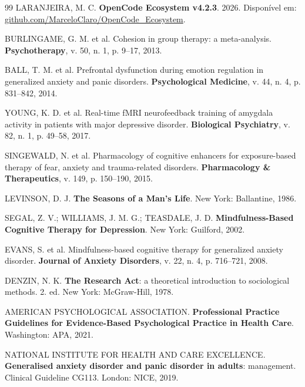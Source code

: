 \documentclass[12pt,a4paper]{article}
\begin{document}
\begin{thebibliography}{99}
LARANJEIRA, M. C. \textbf{OpenCode Ecosystem v4.2.3}. 2026.
Disponível em: \href{https://github.com/MarceloClaro/OpenCode_Ecosystem}{github.com/MarceloClaro/OpenCode\_Ecosystem}.

BURLINGAME, G. M. et al. Cohesion in group therapy: a meta-analysis. \textbf{Psychotherapy}, v. 50, n. 1, p. 9--17, 2013.

BALL, T. M. et al. Prefrontal dysfunction during emotion regulation in generalized anxiety and panic disorders. \textbf{Psychological Medicine}, v. 44, n. 4, p. 831--842, 2014.

YOUNG, K. D. et al. Real-time fMRI neurofeedback training of amygdala activity in patients with major depressive disorder. \textbf{Biological Psychiatry}, v. 82, n. 1, p. 49--58, 2017.

SINGEWALD, N. et al. Pharmacology of cognitive enhancers for exposure-based therapy of fear, anxiety and trauma-related disorders. \textbf{Pharmacology \& Therapeutics}, v. 149, p. 150--190, 2015.

LEVINSON, D. J. \textbf{The Seasons of a Man's Life}. New York: Ballantine, 1986.

SEGAL, Z. V.; WILLIAMS, J. M. G.; TEASDALE, J. D. \textbf{Mindfulness-Based Cognitive Therapy for Depression}. New York: Guilford, 2002.

EVANS, S. et al. Mindfulness-based cognitive therapy for generalized anxiety disorder. \textbf{Journal of Anxiety Disorders}, v. 22, n. 4, p. 716--721, 2008.

DENZIN, N. K. \textbf{The Research Act}: a theoretical introduction to sociological methods. 2. ed. New York: McGraw-Hill, 1978.

AMERICAN PSYCHOLOGICAL ASSOCIATION. \textbf{Professional Practice Guidelines for Evidence-Based Psychological Practice in Health Care}. Washington: APA, 2021.

NATIONAL INSTITUTE FOR HEALTH AND CARE EXCELLENCE. \textbf{Generalised anxiety disorder and panic disorder in adults}: management. Clinical Guideline CG113. London: NICE, 2019.

\end{thebibliography}
\end{document}
